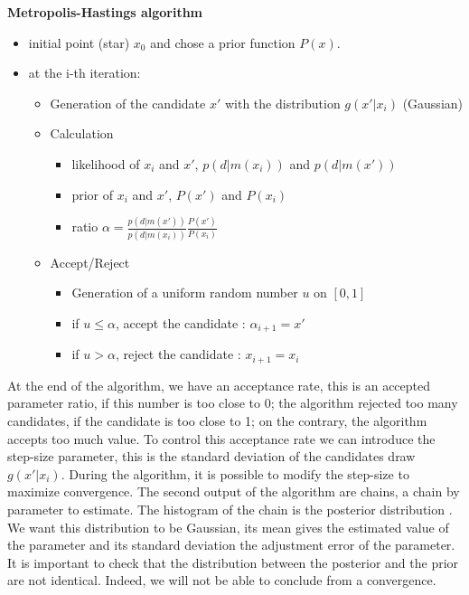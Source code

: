 \documentclass[a4paper,12pt]{article}
\begin{document}
\textbf{Metropolis-Hastings algorithm}
    \begin{itemize}
        \item initial point (star) $x_0$ and chose a prior function $P(x)$. 
        \item at the i-th iteration:
            \begin{itemize}
                \item Generation of the candidate $x'$ with the distribution $g(x'|x_i)$ (Gaussian)
                \item Calculation
                    \begin{itemize}
                        \item likelihood of $x_i$ and $x'$, $p(d|m(x_i))$ and $p(d|m(x'))$
                        \item prior of $x_i$ and $x'$, $P(x')$ and $P(x_i)$
                        \item ratio $\alpha = \frac{p(d|m(x'))}{p(d|m(x_i))} \frac{P(x')}{P(x_i)}$
                    \end{itemize}
                \item Accept/Reject
                \begin{itemize}
                    \item Generation of a uniform random number $u$ on $[0,1]$
                    \item if $u \leq \alpha$, accept the candidate : $\alpha_{i+1} = x'$
                    \item if $u > \alpha$, reject the candidate : $x_{i+1} = x_i$
                \end{itemize}
            \end{itemize}
    \end{itemize}
    
At the end of the algorithm, we have an acceptance rate, this is an accepted parameter ratio, if this number is too close to 0; the algorithm rejected too many candidates, if the candidate is too close to 1; on the contrary, the algorithm accepts too much value. To control this acceptance rate we can introduce the step-size parameter, this is the standard deviation of the candidates draw $g(x'|x_i)$. During the algorithm, it is possible to modify the step-size to maximize convergence. The second output of the algorithm are chains, a chain by parameter to estimate. The histogram of the chain is the posterior distribution . We want this distribution to be Gaussian, its mean gives the estimated value of the parameter and its standard deviation the adjustment error of the parameter. It is important to check that the distribution between the posterior and the prior are not identical. Indeed, we will not be able to conclude from a convergence.
\end{document}
